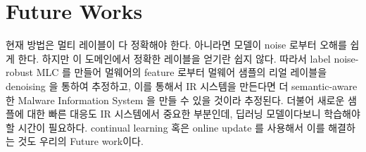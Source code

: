 \section{Future Works}

현재 방법은 멀티 레이블이 다 정확해야 한다. 아니라면 모델이 noise 로부터 오해를 쉽게 한다. 하지만 이 도메인에서 정확한 레이블을 얻기란 쉽지 않다. 따라서 label noise-robust MLC 를 만들어 멀웨어의 feature 로부터 멀웨어 샘플의 리얼 레이블을 denoising 을 통하여 추정하고, 이를 통해서 IR 시스템을 만든다면 더 semantic-aware 한 Malware Information System 을 만들 수 있을 것이라 추정된다.
더불어 새로운 샘플에 대한 빠른 대응도 IR 시스템에서 중요한 부분인데, 딥러닝 모델이다보니 학습해야할 시간이 필요하다. continual learning 혹은 online update 를 사용해서 이를 해결하는 것도 우리의 Future work이다. 


